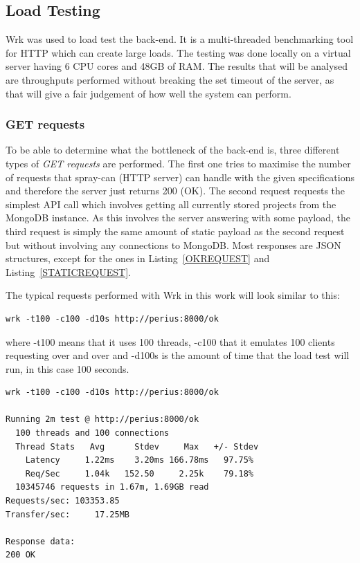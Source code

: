 \documentclass[a4paper,12pt]{article}
\begin{document}
\newpage
\subsection{Load Testing} \label{sec:load_testing}
Wrk was used to load test the back-end. It is a multi-threaded benchmarking tool for HTTP which can
create large loads. The testing was done locally on a virtual server having 6 CPU cores and 48GB of
RAM. The results that will be analysed are throughputs performed without breaking the set timeout 
of the server, as that will give a fair judgement of how well the system can perform.

\subsubsection{GET requests} \label{sec:GET_REQUESTS}
To be able to determine what the bottleneck of the back-end is, three different types of \textit{GET
requests} are performed. The first one tries to maximise the number of requests that spray-can (HTTP
server) can handle with the given specifications and therefore the server just returns 200 (OK). The
second request requests the simplest API call which involves getting all currently stored projects
from the MongoDB instance. As this involves the server answering with some payload, the third
request is simply the same amount of static payload as the second request but without involving any
connections to MongoDB. Most responses are JSON structures, except for the ones in
Listing~\ref{OKREQUEST} and Listing~\ref{STATICREQUEST}.\\

\par
The typical requests performed with Wrk in this work will look similar to this:
\begin{lstlisting}[frame=single]
wrk -t100 -c100 -d10s http://perius:8000/ok
\end{lstlisting}
where -t100 means that it uses 100 threads, -c100 that it emulates 100 clients requesting over and
over and -d100s is the amount of time that the load test will run, in this case 100 seconds.

\begin{minipage}{\linewidth-1cm}
\begin{lstlisting}[label=OKREQUEST,caption=Result of OK requests]
wrk -t100 -c100 -d10s http://perius:8000/ok

Running 2m test @ http://perius:8000/ok
  100 threads and 100 connections
  Thread Stats   Avg      Stdev     Max   +/- Stdev
    Latency     1.22ms    3.20ms 166.78ms   97.75%
    Req/Sec     1.04k   152.50     2.25k    79.18%
  10345746 requests in 1.67m, 1.69GB read
Requests/sec: 103353.85
Transfer/sec:     17.25MB

Response data:
200 OK
\end{lstlisting}
\end{minipage}
\end{document}
